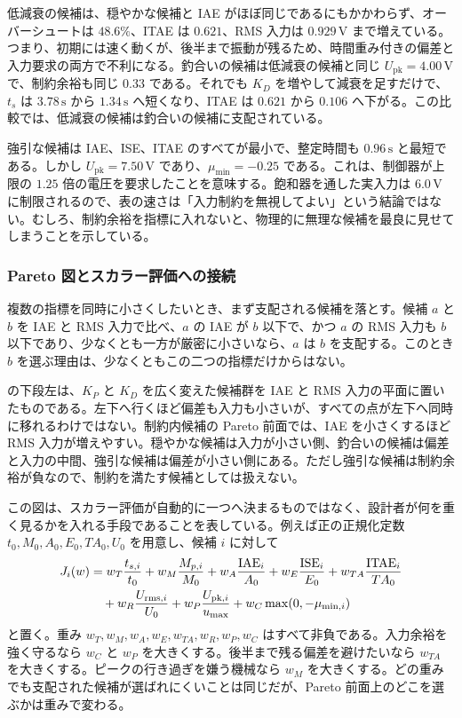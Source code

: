 低減衰の候補は、穏やかな候補と IAE がほぼ同じであるにもかかわらず、オーバーシュートは $48.6\%$、ITAE は $0.621$、RMS 入力は $0.929\,\mathrm{V}$ まで増えている。つまり、初期には速く動くが、後半まで振動が残るため、時間重み付きの偏差と入力要求の両方で不利になる。釣合いの候補は低減衰の候補と同じ $U_{\mathrm{pk}}=4.00\,\mathrm{V}$ で、制約余裕も同じ $0.33$ である。それでも $K_D$ を増やして減衰を足すだけで、$t_s$ は $3.78\,\mathrm{s}$ から $1.34\,\mathrm{s}$ へ短くなり、ITAE は $0.621$ から $0.106$ へ下がる。この比較では、低減衰の候補は釣合いの候補に支配されている。

強引な候補は IAE、ISE、ITAE のすべてが最小で、整定時間も $0.96\,\mathrm{s}$ と最短である。しかし $U_{\mathrm{pk}}=7.50\,\mathrm{V}$ であり、$\mu_{\min}=-0.25$ である。これは、制御器が上限の $1.25$ 倍の電圧を要求したことを意味する。飽和器を通した実入力は $6.0\,\mathrm{V}$ に制限されるので、表の速さは「入力制約を無視してよい」という結論ではない。むしろ、制約余裕を指標に入れないと、物理的に無理な候補を最良に見せてしまうことを示している。

\subsubsection{Pareto 図とスカラー評価への接続}

複数の指標を同時に小さくしたいとき、まず支配される候補を落とす。候補 $a$ と $b$ を IAE と RMS 入力で比べ、$a$ の IAE が $b$ 以下で、かつ $a$ の RMS 入力も $b$ 以下であり、少なくとも一方が厳密に小さいなら、$a$ は $b$ を支配する。このとき $b$ を選ぶ理由は、少なくともこの二つの指標だけからはない。

 の下段左は、$K_P$ と $K_D$ を広く変えた候補群を IAE と RMS 入力の平面に置いたものである。左下へ行くほど偏差も入力も小さいが、すべての点が左下へ同時に移れるわけではない。制約内候補の Pareto 前面では、IAE を小さくするほど RMS 入力が増えやすい。穏やかな候補は入力が小さい側、釣合いの候補は偏差と入力の中間、強引な候補は偏差が小さい側にある。ただし強引な候補は制約余裕が負なので、制約を満たす候補としては扱えない。

この図は、スカラー評価が自動的に一つへ決まるものではなく、設計者が何を重く見るかを入れる手段であることを表している。例えば正の正規化定数 $t_0,M_0,A_0,E_0,TA_0,U_0$ を用意し、候補 $i$ に対して
\begin{align}
  J_i(w)
  &=
  w_T\frac{t_{s,i}}{t_0}
  +w_M\frac{M_{p,i}}{M_0}
  +w_A\frac{\mathrm{IAE}_i}{A_0}
  +w_E\frac{\mathrm{ISE}_i}{E_0}
  +w_{TA}\frac{\mathrm{ITAE}_i}{TA_0} \notag\\
  &\quad
  +w_R\frac{U_{\mathrm{rms},i}}{U_0}
  +w_P\frac{U_{\mathrm{pk},i}}{u_{\max}}
  +w_C\max(0,-\mu_{\min,i})
  \label{eq:scalar-cost-from-indices}
\end{align}
と置く。重み $w_T,w_M,w_A,w_E,w_{TA},w_R,w_P,w_C$ はすべて非負である。入力余裕を強く守るなら $w_C$ と $w_P$ を大きくする。後半まで残る偏差を避けたいなら $w_{TA}$ を大きくする。ピークの行き過ぎを嫌う機械なら $w_M$ を大きくする。どの重みでも支配された候補が選ばれにくいことは同じだが、Pareto 前面上のどこを選ぶかは重みで変わる。

